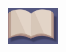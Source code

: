 \documentclass{article}
\begin{document}
\begin{center}
    \includegraphics[width=50px,height =50px]{logo.jpg}
\end{center}

\end{document}
